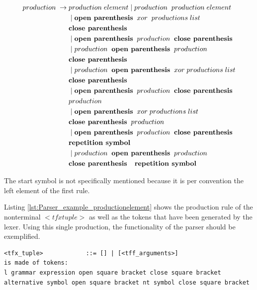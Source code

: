 \begin{align*}
	production\; \rightarrow\; &production\; element
                \mid production\;\; production\; element \\
               &\mid \textbf{open parenthesis}\;\; xor\; \;productions\; list\;\; \\
               &\textbf{close parenthesis} \\
               &\mid \textbf{open parenthesis}\;\; production\;\; \textbf{close parenthesis} \\
               &\mid production \;\;\textbf{open parenthesis}\;\; production \\
               &\textbf{close parenthesis} \\
               &\mid production\;\; \textbf{open parenthesis} \;\;xor \;productions\; list\\
               &\textbf{close parenthesis} \\
               &\mid \textbf{open parenthesis} \;\;production \;\;\textbf{close parenthesis} \\
               &production \\
               &\mid \textbf{open parenthesis}\;\; xor\; productions\; list\\ 
               &\textbf{close parenthesis}\;\; production \\
               &\mid \textbf{open parenthesis}\;\; production\;\; \textbf{close parenthesis} \\
               &\textbf{repetition symbol}\\
               &\mid production\;\; \textbf{open parenthesis} \;\;production \\
               &\textbf{close parenthesis \; repetition symbol}
\end{align*}


The start symbol is not specifically mentioned because it is per convention the left element of the first rule.

Listing \ref{lst:Parser_example_productionelement} shows the production rule of the nonterminal $<tfx tuple>$ as well as the tokens that have been generated by the lexer. Using this single production, the functionality of the parser should be exemplified. \\

\begin{lstlisting}[basicstyle=\scriptsize	,caption= Production element,label= lst:Parser_example_productionelement]
<tfx_tuple>            ::= [] | [<tff_arguments>]
is made of tokens:
l grammar expression open square bracket close square bracket alternative symbol open square bracket nt symbol close square bracket
\end{lstlisting}

